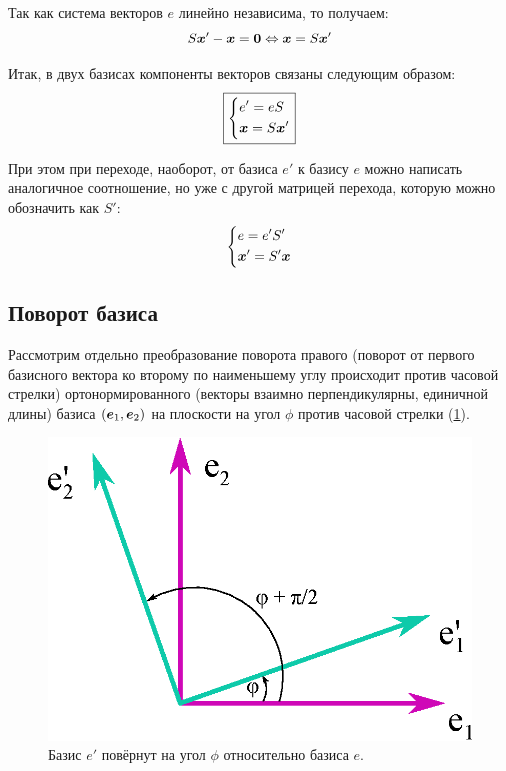 \documentclass[a4paper,12pt]{article}
\begin{document}
  Так как система векторов $e$ линейно независима, то получаем:
  \[
    S \boldsymbol x' - \boldsymbol x = \boldsymbol 0 \Leftrightarrow \boldsymbol x = S \boldsymbol x'
  \]
  
  Итак, в двух базисах компоненты векторов связаны следующим образом:
  \begin{equation}\label{eq:vector1-to-vector2}
    \boxed{
      \left\{
        \begin{aligned}
          &e' = e S\\
          &\boldsymbol x = S \boldsymbol x'
        \end{aligned}
      \right.
    }
  \end{equation}
  
  При этом при переходе, наоборот, от базиса $e'$ к базису $e$ можно написать аналогичное соотношение, но уже с другой матрицей перехода, которую можно обозначить как $S'$:
  \[
    \left\{
      \begin{aligned}
        &e = e' S'\\
        &\boldsymbol x' = S' \boldsymbol x
      \end{aligned}
    \right.
  \]
  
  
  \subsection{Поворот базиса}
  
  Рассмотрим отдельно преобразование поворота правого (поворот от первого базисного вектора ко второму по наименьшему углу происходит против часовой стрелки) ортонормированного (векторы взаимно перпендикулярны, единичной длины) базиса $(\boldsymbol e_1, \boldsymbol e_2)$ на плоскости на угол $\phi$ против часовой стрелки (\ref{fig:turned-ortonorm-basis}).

  \begin{figure}[h]
    \centering
    
    \includegraphics[width=0.4\columnwidth]{turned-ortonorm-basis}
    
    \caption{Базис $e'$ повёрнут на угол $\phi$ относительно базиса $e$.}
    \label{fig:turned-ortonorm-basis}
  \end{figure}
  
\end{document}

